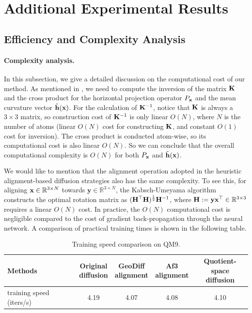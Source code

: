 \section{Additional Experimental Results}\label{appx:add-exp}
\subsection{Efficiency and Complexity Analysis}
\paragraph{Complexity analysis.}In this subsection, we give a detailed discussion on the computational cost of our method. As mentioned in , we need to compute the inversion of the matrix $\mathbf{K}$ and the cross product for the horizontal projection operator $P_{\mathbf{x}}$ and the mean curvature vector $\tilde{\mathbf{h}}(\mathbf{x})$. For the calculation of $\mathbf{K}^{-1}$, notice that $\mathbf{K}$ is always a $3\times 3$ matrix, so construction cost of $\mathbf{K}^{-1}$ is only linear $O(N)$, where $N$ is the number of atoms (linear $O(N)$ cost for constructing $\mathbf{K}$, and constant $O(1)$ cost for inversion). The cross product is conducted atom-wise, so its computational cost is also linear $O(N)$. So we can conclude that the overall computational complexity is $O(N)$ for both $P_{\mathbf{x}}$ and $\tilde{\mathbf{h}}(\mathbf{x})$.

We would like to mention that the alignment operation adopted in the heuristic alignment-based diffusion strategies also has the same complexity. To see this, for aligning $\mathbf{x}\in\mathbb{R}^{3\times N}$ towards $\mathbf{y}\in\mathbb{R}^{3\times N}$, the Kabsch-Umeyama algorithm constructs the optimal rotation matrix as $(\mathbf{H}^{\top} \mathbf{H})^{\frac{1}{2}} \mathbf{H}^{-1}$, where $\mathbf{H}:=\mathbf{y} \mathbf{x}^{\top} \in \mathbb{R}^{3\times 3}$ requires a linear $O(N)$ cost. In practice, the $O(N)$ computational cost is negligible compared to the cost of gradient back-propagation through the neural network. A comparison of practical training times is shown in the following table.

\begin{table}[h]
\centering
\caption{Training speed comparison on QM9.}
\begin{tabular}{lcccc}
\toprule
Methods & \tabincell{c}{Original \\ diffusion} & \tabincell{c}{GeoDiff \\ alignment} & \tabincell{c}{Af3 \\ alignment} & \tabincell{c}{Quotient-space \\ diffusion} \\
\midrule
training speed (iters/s) & 4.19 & 4.07 & 4.08 & 4.10 \\
\bottomrule
\end{tabular}
\end{table}

